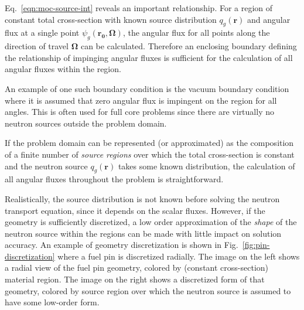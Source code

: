 Eq.~\ref{eqn:moc-source-int} reveals an important relationship. For a region of constant total cross-section with known source distribution $q_g(\mathbf{r})$ and angular flux at a single point $\psi_g(\mathbf{r_0},\mathbf{\Omega})$, the angular flux for all points along the direction of travel $\mathbf{\Omega}$ can be calculated. Therefore an enclosing boundary defining the relationship of impinging angular fluxes is sufficient for the calculation of all angular fluxes within the region.

An example of one such boundary condition is the vacuum boundary condition where it is assumed that zero angular flux is impingent on the region for all angles. This is often used for full core problems since there are virtually no neutron sources outside the problem domain.

If the problem domain can be represented (or approximated) as the composition of a finite number of \textit{source regions} over which the total cross-section is constant and the neutron source $q_g(\mathbf{r})$ takes some known distribution, the calculation of all angular fluxes throughout the problem is straightforward.

Realistically, the source distribution is not known before solving the neutron transport equation, since it depends on the scalar fluxes. However, if the geometry is sufficiently discretized, a low order approximation of the \textit{shape} of the neutron source within the regions can be made with little impact on solution accuracy. An example of geometry discretization is shown in Fig.~\ref{fig:pin-discretization} where a fuel pin is discretized radially. The image on the left shows a radial view of the fuel pin geometry, colored by (constant cross-section) material region. The image on the right shows a discretized form of that geometry, colored by source region over which the neutron source is assumed to have some low-order form.

